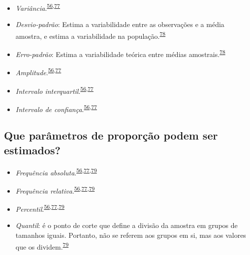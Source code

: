 \documentclass[
  a4paper,
]{book}
\begin{document}
\begin{itemize}
\item
  \emph{Variância}.\textsuperscript{\protect\hyperlink{ref-Ali2016}{56},\protect\hyperlink{ref-kanji2006}{77}}
\item
  \emph{Desvio-padrão}: Estima a variabilidade entre as observações e a média amostra, e estima a variabilidade na população.\textsuperscript{\protect\hyperlink{ref-Curran-Everett2008}{78}}
\item
  \emph{Erro-padrão}: Estima a variabilidade teórica entre médias amostrais.\textsuperscript{\protect\hyperlink{ref-Curran-Everett2008}{78}}
\item
  \emph{Amplitude}.\textsuperscript{\protect\hyperlink{ref-Ali2016}{56},\protect\hyperlink{ref-kanji2006}{77}}
\item
  \emph{Intervalo interquartil}.\textsuperscript{\protect\hyperlink{ref-Ali2016}{56},\protect\hyperlink{ref-kanji2006}{77}}
\item
  \emph{Intervalo de confiança}.\textsuperscript{\protect\hyperlink{ref-Ali2016}{56},\protect\hyperlink{ref-kanji2006}{77}}
\end{itemize}

\hypertarget{que-paruxe2metros-de-proporuxe7uxe3o-podem-ser-estimados}{%
\subsection{Que parâmetros de proporção podem ser estimados?}\label{que-paruxe2metros-de-proporuxe7uxe3o-podem-ser-estimados}}

\begin{itemize}
\item
  \emph{Frequência absoluta}.\textsuperscript{\protect\hyperlink{ref-Ali2016}{56},\protect\hyperlink{ref-kanji2006}{77},\protect\hyperlink{ref-Altman1994}{79}}
\item
  \emph{Frequência relativa}.\textsuperscript{\protect\hyperlink{ref-Ali2016}{56},\protect\hyperlink{ref-kanji2006}{77},\protect\hyperlink{ref-Altman1994}{79}}
\item
  \emph{Percentil}.\textsuperscript{\protect\hyperlink{ref-Ali2016}{56},\protect\hyperlink{ref-kanji2006}{77},\protect\hyperlink{ref-Altman1994}{79}}
\item
  \emph{Quantil}: é o ponto de corte que define a divisão da amostra em grupos de tamanhos iguais. Portanto, não se referem aos grupos em si, mas aos valores que os dividem.\textsuperscript{\protect\hyperlink{ref-Altman1994}{79}}
\end{itemize}
\end{document}
